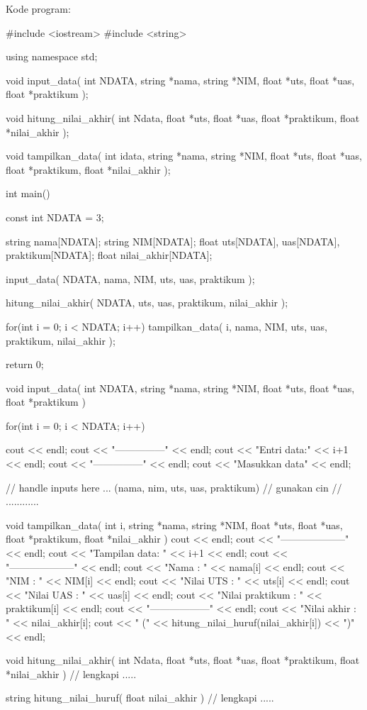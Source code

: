 \documentclass[a4paper,11pt]{extarticle}
\begin{document}
Kode program:
\begin{cppcode}
#include <iostream>
#include <string>

using namespace std;

void input_data(
  int NDATA,
  string *nama, string *NIM, float *uts, float *uas, float *praktikum
);

void hitung_nilai_akhir(
  int Ndata,
  float *uts, float *uas, float *praktikum,
  float *nilai_akhir
);

void tampilkan_data(
  int idata,
  string *nama, string *NIM, float *uts, float *uas, float *praktikum,
  float *nilai_akhir
);

int main()
{
  const int NDATA = 3;
  
  string nama[NDATA];
  string NIM[NDATA];
  float uts[NDATA], uas[NDATA], praktikum[NDATA];
  float nilai_akhir[NDATA];

  input_data( NDATA, nama, NIM, uts, uas, praktikum );

  hitung_nilai_akhir( NDATA, uts, uas, praktikum, nilai_akhir );

  for(int i = 0; i < NDATA; i++) {
    tampilkan_data( i, nama, NIM, uts, uas, praktikum, nilai_akhir );
  }

  return 0;

}

void input_data(
  int NDATA,
  string *nama, string *NIM, float *uts, float *uas, float *praktikum
)
{
  for(int i = 0; i < NDATA; i++) {
    cout << endl;
    cout << "---------------" << endl;
    cout << "Entri data:" << i+1 << endl;
    cout << "---------------" << endl;
    cout << "Masukkan data" << endl;
    
    // handle inputs here ... (nama, nim, uts, uas, praktikum)
    // gunakan cin
    // ............
  }
}

void tampilkan_data(
  int i,
  string *nama, string *NIM, float *uts, float *uas, float *praktikum,
  float *nilai_akhir
)
{
  cout << endl;
  cout << "--------------------" << endl;
  cout << "Tampilan data: " << i+1 << endl;
  cout << "--------------------" << endl;
  cout << "Nama            : " << nama[i] << endl;
  cout << "NIM             : " << NIM[i] << endl;
  cout << "Nilai UTS       : " << uts[i] << endl;
  cout << "Nilai UAS       : " << uas[i] << endl;
  cout << "Nilai praktikum : " << praktikum[i] << endl;
  cout << "------------------" << endl;
  cout << "Nilai akhir     : " << nilai_akhir[i];
  cout << " (" << hitung_nilai_huruf(nilai_akhir[i]) << ")" << endl;
}

void hitung_nilai_akhir(
  int Ndata,
  float *uts, float *uas, float *praktikum,
  float *nilai_akhir
)
{
  // lengkapi .....
}


string hitung_nilai_huruf( float nilai_akhir )
{
  // lengkapi .....
}
\end{cppcode}
\end{document}
